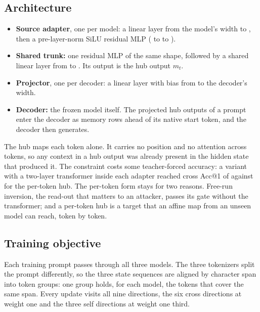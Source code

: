 \subsection{Architecture}\label{sec:hub:arch}

\begin{itemize}
\item \textbf{Source adapter}, one per model: a linear layer from the model's width to , then a pre-layer-norm SiLU residual MLP ( to  to ).
\item \textbf{Shared trunk:} one residual MLP of the same shape, followed by a shared linear layer from  to . Its output is the hub output $m_t$.
\item \textbf{Projector}, one per decoder: a linear layer with bias from  to the decoder's width.
\item \textbf{Decoder:} the frozen model itself. The projected hub outputs of a prompt enter the decoder as memory rows ahead of its native start token, and the decoder then generates.
\end{itemize}

The hub maps each token alone. It carries no position and no attention across tokens, so any context in a hub output was already present in the hidden state that produced it. The constraint costs some teacher-forced accuracy: a variant with a two-layer transformer inside each adapter reached cross Acc@1 of  against  for the per-token hub. %
The per-token form stays for two reasons. Free-run inversion, the read-out that matters to an attacker, passes its gate without the transformer; and a per-token hub is a target that an affine map from an unseen model can reach, token by token.


\subsection{Training objective}\label{sec:hub:training}

Each training prompt passes through all three models. The three tokenizers split the prompt differently, so the three state sequences are aligned by character span into token groups: one group holds, for each model, the tokens that cover the same span. Every update visits all nine directions, the six cross directions at weight one and the three self directions at weight one third.

